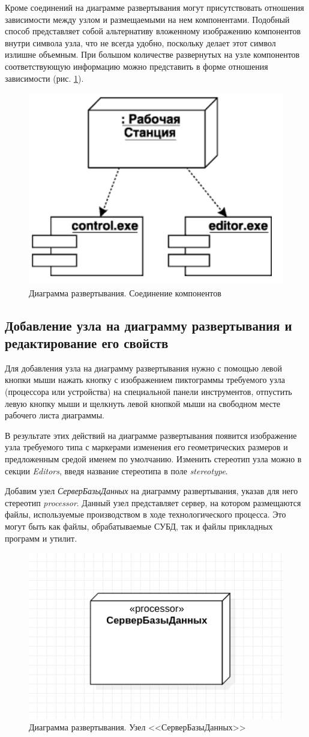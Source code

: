 \documentclass[a4paper,12pt]{extreport}
\begin{document}
Кроме соединений на диаграмме развертывания могут присутствовать отношения зависимости между узлом и размещаемыми на нем компонентами. Подобный способ представляет собой альтернативу вложенному изображению компонентов внутри символа узла, что не всегда удобно, поскольку делает этот символ излишне объемным. При большом количестве развернутых на узле компонентов соответствующую информацию можно представить в форме отношения зависимости (рис. \ref{fig:deployementbuses1}).
\begin{figure}[h!]
	\centering
	\includegraphics[width=0.4\linewidth]{images/deployementbuses1}
	\caption{Диаграмма развертывания. Соединение компонентов}
	\label{fig:deployementbuses1}
\end{figure}


\subsection*{Добавление узла на диаграмму развертывания и редактирование его свойств}

Для добавления узла на диаграмму развертывания нужно с помощью левой кнопки мыши нажать кнопку с изображением пиктограммы требуемого узла (процессора или устройства) на специальной панели инструментов, отпустить левую кнопку мыши и щелкнуть левой кнопкой мыши на свободном месте рабочего листа диаграммы.

В результате этих действий на диаграмме развертывания появится изображение узла требуемого типа с маркерами изменения его геометрических размеров и предложенным средой именем по умолчанию. Изменить стереотип узла можно в секции \textit{Editors}, введя название стереотипа в поле \textit{stereotype}.

Добавим узел \textit{СерверБазыДанных} на диаграмму развертывания, указав для него стереотип \textit{processor}. Данный узел представляет сервер, на котором размещаются файлы, используемые производством в ходе технологического процесса. Это могут быть как файлы, обрабатываемые СУБД, так и файлы прикладных программ и утилит.
\begin{figure}[h!]
	\centering
	\includegraphics[width=0.4\linewidth]{images/deployementnode}
	\caption{Диаграмма развертывания. Узел <<СерверБазыДанных>>}
	\label{fig:deployementnode}
\end{figure}
\end{document}

